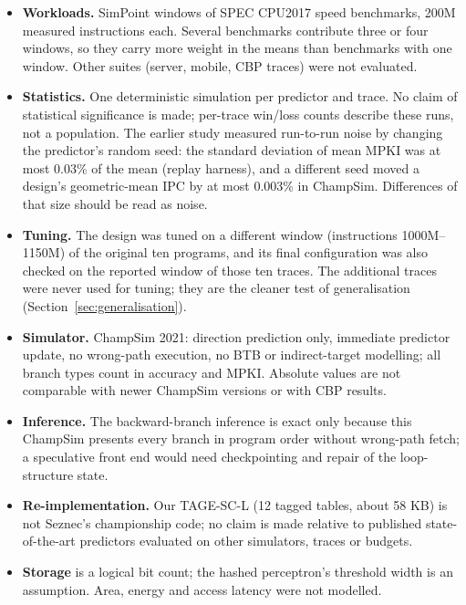 \begin{itemize}
\item \textbf{Workloads.}  SimPoint windows of  SPEC CPU2017 speed benchmarks, 200M measured instructions each. Several benchmarks contribute three or four windows, so they carry more weight in the means than benchmarks with one window. Other suites (server, mobile, CBP traces) were not evaluated.
\item \textbf{Statistics.} One deterministic simulation per predictor and trace. No claim of statistical significance is made; per-trace win/loss counts describe these runs, not a population. The earlier study measured run-to-run noise by changing the predictor's random seed: the standard deviation of mean MPKI was at most 0.03\% of the mean (replay harness), and a different seed moved a design's geometric-mean IPC by at most 0.003\% in ChampSim. Differences of that size should be read as noise.
\item \textbf{Tuning.} The design was tuned on a different window (instructions 1000M--1150M) of the original ten programs, and its final configuration was also checked on the reported window of those ten traces. The  additional traces were never used for tuning; they are the cleaner test of generalisation (Section~\ref{sec:generalisation}).
\item \textbf{Simulator.} ChampSim 2021: direction prediction only, immediate predictor update, no wrong-path execution, no BTB or indirect-target modelling; all branch types count in accuracy and MPKI. Absolute values are not comparable with newer ChampSim versions or with CBP results.
\item \textbf{Inference.} The backward-branch inference is exact only because this ChampSim presents every branch in program order without wrong-path fetch; a speculative front end would need checkpointing and repair of the loop-structure state.
\item \textbf{Re-implementation.} Our TAGE-SC-L (12 tagged tables, about 58 KB) is not Seznec's championship code; no claim is made relative to published state-of-the-art predictors evaluated on other simulators, traces or budgets.
\item \textbf{Storage} is a logical bit count; the hashed perceptron's threshold width is an assumption. Area, energy and access latency were not modelled.
\end{itemize}
